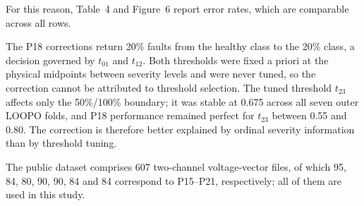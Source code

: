 For this reason, Table~4 and Figure~6 report error rates, which are comparable across all
rows.


The P18 corrections return 20\% faults from the healthy class to the 20\% class, a decision
governed by $t_{01}$ and $t_{12}$. Both thresholds were fixed a priori at the physical
midpoints between severity levels and were never tuned, so the correction cannot be
attributed to threshold selection. The tuned threshold $t_{23}$ affects only the 50\%/100\%
boundary; it was stable at 0.675 across all seven outer LOOPO folds, and P18 performance
remained perfect for $t_{23}$ between 0.55 and 0.80. The correction is therefore better
explained by ordinal severity information than by threshold tuning.


The public dataset comprises 607 two-channel voltage-vector files, of which 95, 84, 80, 90,
90, 84 and 84 correspond to P15--P21, respectively; all of them are used in this study.


